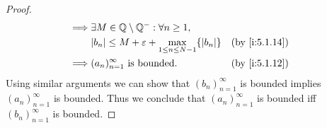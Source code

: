 \begin{proof}
\begin{align*}
    \implies & \exists M \in \Q \setminus \Q^- : \forall n \geq 1,                                                                \\
             & \abs{b_n} \leq M + \varepsilon + \max_{1 \leq n \leq N - 1}\set{\abs{b_n}}                  &  & \by{i:5.1.14}     \\
    \implies & (a_n)_{n = 1}^\infty \text{ is bounded}.                                                    &  & \by{i:5.1.12}
  \end{align*}
  Using similar arguments we can show that \((b_n)_{n = 1}^\infty\) is bounded implies \((a_n)_{n = 1}^\infty\) is bounded.
  Thus we conclude that \((a_n)_{n = 1}^\infty\) is bounded iff \((b_n)_{n = 1}^\infty\) is bounded.
\end{proof}
